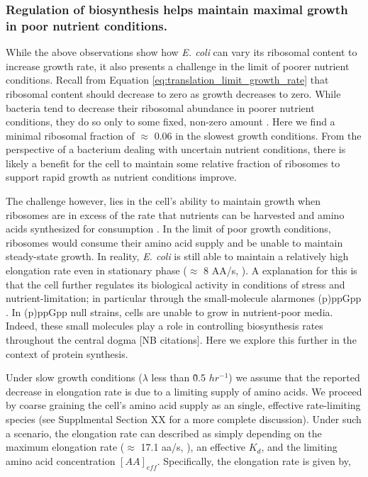 \subsubsection{Regulation of biosynthesis helps maintain maximal growth
in poor nutrient conditions.}

While the above observations show how \textit{E. coli} can vary its ribosomal
content to increase growth rate, it also presents a challenge in the limit of
poorer nutrient conditions. Recall from Equation
\ref{eq:translation_limit_growth_rate} that ribosomal content should decrease to
zero as growth decreases to zero. While bacteria tend to decrease their
ribosomal abundance in poorer nutrient conditions, they do so only to some
fixed, non-zero amount \citep{scott2010, liebermeister2014}. Here we find a
minimal ribosomal fraction of $\approx$ 0.06 in the slowest growth conditions.
From the perspective of a bacterium dealing with uncertain nutrient conditions,
there is likely a benefit for the cell to maintain some relative fraction of
ribosomes to support rapid growth as nutrient conditions improve.

The challenge however, lies in the cell's ability to maintain growth when
ribosomes are in excess of the rate that nutrients can be harvested and amino
acids synthesized for consumption . In the limit
of poor growth conditions, ribosomes would consume their amino acid supply and
be unable to maintain steady-state growth. In reality, \textit{E. coli} is still
able to maintain a relatively high elongation rate even in stationary phase
($\approx$ 8 AA/s, \citep{dai2016, dai2018}). A explanation for this is that the
cell further regulates its biological activity in conditions of stress and
nutrient-limitation; in particular through the small-molecule alarmones (p)ppGpp
\citep{harris2018}. In (p)ppGpp null strains, cells are unable to grow in
nutrient-poor media. Indeed, these small molecules play a role in controlling
biosynthesis rates throughout the central dogma [NB citations]. Here we explore
this further in the context of protein synthesis.

Under slow growth conditions ($\lambda$ less than \~ 0.5 $hr^{-1}$) we assume
that the reported decrease in elongation rate is due to a limiting supply of
amino acids. We proceed by coarse graining the cell's amino acid supply as an
single, effective rate-limiting species (see Supplmental Section XX for a more
complete discussion). Under such a scenario, the elongation rate can described
as simply depending on the maximum elongation rate ($\approx$ 17.1 aa/s,
\citep{dai2016, dai2018}), an effective $K_d$, and the limiting amino acid
concentration $[AA]_{eff}$. Specifically, the elongation rate is given by,

